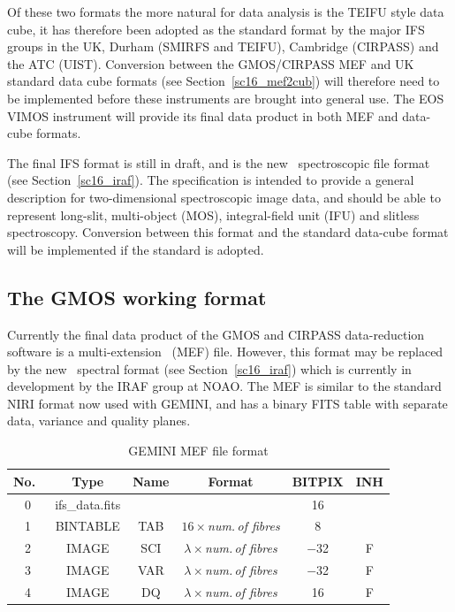 \documentclass[twoside,11pt]{article}
\newcommand{\htmlref}[2]{#1}
\newcommand{\latex}[1]{#1}
\newcommand{\xlabel}[1]{}
\begin{document}
Of these two formats the more natural for data analysis is the TEIFU
style data cube, it has therefore been adopted as the standard format
by the major IFS groups in the UK, Durham (SMIRFS and TEIFU),
Cambridge (CIRPASS) and the ATC (UIST).
\htmlref{Conversion}{sc16_mef2cub} between the GMOS/CIRPASS MEF and UK
standard data cube formats\latex{ (see
Section~\ref{sc16_mef2cub})} will therefore need to be implemented
before these instruments are brought into general use.  The EOS VIMOS
instrument will provide its final data product in both MEF and
data-cube formats.

The final IFS format is still in draft, and is the new \IRAF\ 
spectroscopic \htmlref{file format}{sc16_iraf}\latex{
(see Section~\ref{sc16_iraf})}.  The specification is intended to
provide a general description for two-dimensional spectroscopic image
data, and should be able to represent long-slit, multi-object (MOS),
integral-field unit (IFU) and slitless spectroscopy.  Conversion
between this format and the standard data-cube format will be
implemented if the standard is adopted.

\subsection{\xlabel{sc16_gmosfile}The GMOS working format\label{sc16_gmosfile}}

Currently the final data product of the \htmlref{GMOS}{sc16_gmos} and
\htmlref{CIRPASS}{sc16_cirpass} data-reduction software is a
multi-extension \FITSref\ (MEF) file.  However, this format may be
replaced by the new \htmlref{\IRAF\ spectral
format}{sc16_iraf}\latex{ (see Section~\ref{sc16_iraf})} which is
currently in development by the IRAF group at NOAO.  The MEF is
similar to the standard NIRI format now used with GEMINI, and has a
binary FITS table with separate data, variance and quality planes.

\begin{table}[h]
\begin{center}
\begin{tabular}{cccccc}
No.\ & Type  & Name & Format & BITPIX & INH\\\hline 
0  & ifs\_data.fits &  &                                     &  16 &   \\
1  & BINTABLE  & TAB & $16 \times${\em num.\,of fibres}      &   8 &   \\    
2  & IMAGE     & SCI & $\lambda \times${\em num.\,of fibres} & $-$32 & F \\
3  & IMAGE     & VAR & $\lambda \times${\em num.\,of fibres} & $-$32 & F \\
4  & IMAGE     & DQ  & $\lambda \times${\em num.\,of fibres} &  16 & F \\ \hline
\end{tabular}
\caption{GEMINI MEF file format}
\end{center}
\protect\label{tab:mef_file}
\end{table} 
\end{document}

